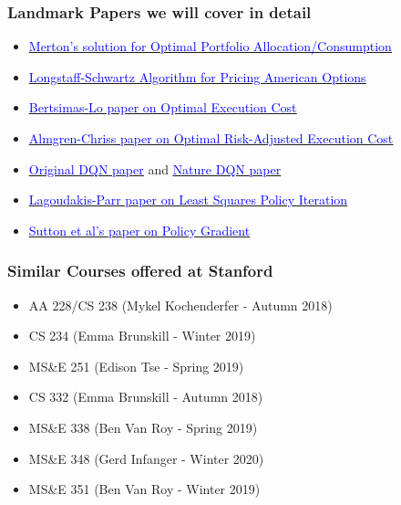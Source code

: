 \documentclass[handout]{beamer}
\begin{document}
\begin{frame}
\frametitle{Landmark Papers we will cover in detail}
\begin{itemize}
\item \href{https://www.jstor.org/stable/1926560}{\underline{\textcolor{blue}{Merton's solution for Optimal Portfolio Allocation/Consumption}}}
\item \href{https://people.math.ethz.ch/~hjfurrer/teaching/LongstaffSchwartzAmericanOptionsLeastSquareMonteCarlo.pdf}{\underline{\textcolor{blue}{Longstaff-Schwartz Algorithm for Pricing American Options}}}
\item \href{http://alo.mit.edu/wp-content/uploads/2015/06/Optimal-Control-of-Execution-Costs.pdf}{\underline{\textcolor{blue}{Bertsimas-Lo paper on Optimal Execution Cost}}}
\item \href{https://pdfs.semanticscholar.org/3d2d/773983c5201b58586af463f045befae5bbf2.pdf}{\underline{\textcolor{blue}{Almgren-Chriss paper on Optimal Risk-Adjusted Execution Cost}}}
\item \href{https://www.cs.toronto.edu/~vmnih/docs/dqn.pdf}{\underline{\textcolor{blue}{Original DQN paper}}} and \href{https://storage.googleapis.com/deepmind-media/dqn/DQNNaturePaper.pdf}{\underline{\textcolor{blue}{Nature DQN paper}}}
\item \href{http://www.jmlr.org/papers/volume4/lagoudakis03a/lagoudakis03a.pdf}{\underline{\textcolor{blue}{Lagoudakis-Parr paper on Least Squares Policy Iteration}}}
\item \href{http://papers.nips.cc/paper/1713-policy-gradient-methods-for-reinforcement-learning-with-function-approximation.pdf}{\underline{\textcolor{blue}{Sutton et al's paper on Policy Gradient}}}
\end{itemize}
\end{frame}


\begin{frame}
\frametitle{Similar Courses offered at Stanford}
\begin{itemize}
\item AA 228/CS 238 (Mykel Kochenderfer - Autumn 2018)
\item CS 234 (Emma Brunskill - Winter 2019)
\item MS\&E 251 (Edison Tse - Spring 2019)
\item CS 332 (Emma Brunskill - Autumn 2018)
\item MS\&E 338 (Ben Van Roy - Spring 2019)
\item MS\&E 348 (Gerd Infanger - Winter 2020)
\item MS\&E 351 (Ben Van Roy - Winter 2019)
\end{itemize}
\end{frame}
\end{document}
